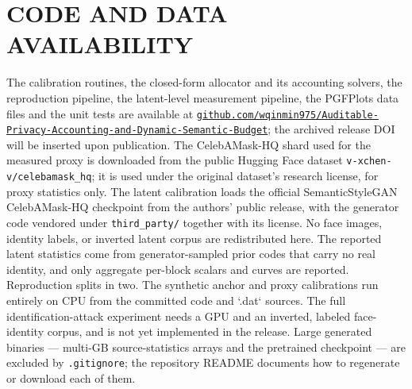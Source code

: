 \documentclass{ieeetj}
\theoremstyle{plain}
\theoremstyle{definition}
\begin{document}
\section*{CODE AND DATA AVAILABILITY}
The calibration routines, the closed-form allocator and its accounting solvers, the
reproduction pipeline, the latent-level measurement pipeline, the PGFPlots data files
and the unit tests are available at
\href{https://github.com/wqinmin975/Auditable-Privacy-Accounting-and-Dynamic-Semantic-Budget}{\texttt{github.com/wqinmin975/\allowbreak Auditable-\allowbreak Privacy-\allowbreak Accounting-\allowbreak and-\allowbreak Dynamic-\allowbreak Semantic-\allowbreak Budget}};
the archived release DOI will be inserted upon publication. The CelebAMask-HQ shard used
for the measured proxy is downloaded from the public Hugging Face dataset \texttt{v-xchen-v/celebamask\_hq}; it is
used under the original dataset's research license, for proxy statistics only. The
latent calibration loads the official SemanticStyleGAN CelebAMask-HQ checkpoint from the
authors' public release, with the generator code vendored under \texttt{third\_party/} together with its
license. No face images, identity labels, or inverted latent corpus are redistributed
here. The reported latent statistics come from generator-sampled prior codes that carry
no real identity, and only aggregate per-block scalars and curves are reported.
Reproduction splits in two. The synthetic anchor and proxy calibrations run entirely on
CPU from the committed code and `.dat` sources. The full identification-attack
experiment needs a GPU and an inverted, labeled face-identity corpus, and is not yet
implemented in the release. Large generated binaries --- multi-GB source-statistics
arrays and the pretrained checkpoint --- are excluded by \texttt{.gitignore}; the repository README
documents how to regenerate or download each of them.
\end{document}
